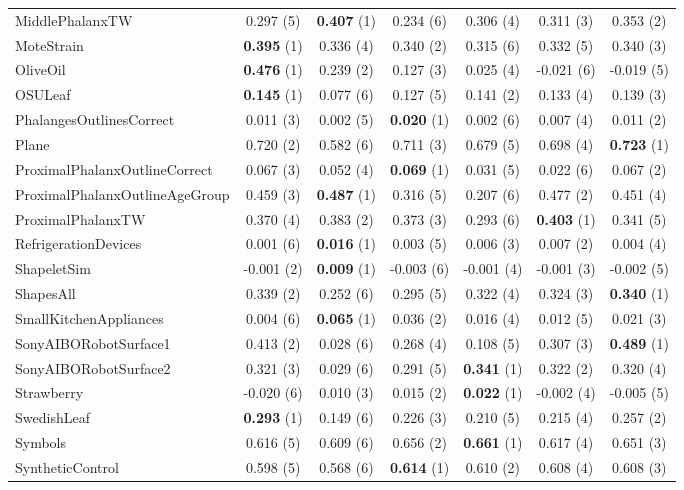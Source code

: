\begin{table}[ht]
\begin{adjustbox}{width=\textwidth}
\begin{tabular}{lcccccc}
MiddlePhalanxTW & 0.297 (5) & \textbf{0.407} (1) & 0.234 (6) & 0.306 (4) & 0.311 (3) & 0.353 (2) \\
MoteStrain & \textbf{0.395} (1) & 0.336 (4) & 0.340 (2) & 0.315 (6) & 0.332 (5) & 0.340 (3) \\
OliveOil & \textbf{0.476} (1) & 0.239 (2) & 0.127 (3) & 0.025 (4) & -0.021 (6) & -0.019 (5) \\
OSULeaf & \textbf{0.145} (1) & 0.077 (6) & 0.127 (5) & 0.141 (2) & 0.133 (4) & 0.139 (3) \\
PhalangesOutlinesCorrect & 0.011 (3) & 0.002 (5) & \textbf{0.020} (1) & 0.002 (6) & 0.007 (4) & 0.011 (2) \\
Plane & 0.720 (2) & 0.582 (6) & 0.711 (3) & 0.679 (5) & 0.698 (4) & \textbf{0.723} (1) \\
ProximalPhalanxOutlineCorrect & 0.067 (3) & 0.052 (4) & \textbf{0.069} (1) & 0.031 (5) & 0.022 (6) & 0.067 (2) \\
ProximalPhalanxOutlineAgeGroup & 0.459 (3) & \textbf{0.487} (1) & 0.316 (5) & 0.207 (6) & 0.477 (2) & 0.451 (4) \\
ProximalPhalanxTW & 0.370 (4) & 0.383 (2) & 0.373 (3) & 0.293 (6) & \textbf{0.403} (1) & 0.341 (5) \\
RefrigerationDevices & 0.001 (6) & \textbf{0.016} (1) & 0.003 (5) & 0.006 (3) & 0.007 (2) & 0.004 (4) \\
ShapeletSim & -0.001 (2) & \textbf{0.009} (1) & -0.003 (6) & -0.001 (4) & -0.001 (3) & -0.002 (5) \\
ShapesAll & 0.339 (2) & 0.252 (6) & 0.295 (5) & 0.322 (4) & 0.324 (3) & \textbf{0.340} (1) \\
SmallKitchenAppliances & 0.004 (6) & \textbf{0.065} (1) & 0.036 (2) & 0.016 (4) & 0.012 (5) & 0.021 (3) \\
SonyAIBORobotSurface1 & 0.413 (2) & 0.028 (6) & 0.268 (4) & 0.108 (5) & 0.307 (3) & \textbf{0.489} (1) \\
SonyAIBORobotSurface2 & 0.321 (3) & 0.029 (6) & 0.291 (5) & \textbf{0.341} (1) & 0.322 (2) & 0.320 (4) \\
Strawberry & -0.020 (6) & 0.010 (3) & 0.015 (2) & \textbf{0.022} (1) & -0.002 (4) & -0.005 (5) \\
SwedishLeaf & \textbf{0.293} (1) & 0.149 (6) & 0.226 (3) & 0.210 (5) & 0.215 (4) & 0.257 (2) \\
Symbols & 0.616 (5) & 0.609 (6) & 0.656 (2) & \textbf{0.661} (1) & 0.617 (4) & 0.651 (3) \\
SyntheticControl & 0.598 (5) & 0.568 (6) & \textbf{0.614} (1) & 0.610 (2) & 0.608 (4) & 0.608 (3) \\

\end{tabular}
\end{adjustbox}
\end{table}
